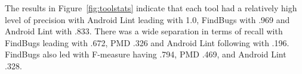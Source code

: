 \documentclass{sig-alternate}
\newcommand{\todo}[1]{\textcolor{cyan}{\textbf{[#1]}}}
\begin{document}



The results in  Figure~\ref{fig:toolstats} indicate that each tool had a relatively high level of precision with Android Lint leading with 1.0, FindBugs with .969 and Android Lint with .833. There was a wide separation in terms of recall with FindBugs leading with .672, PMD .326 and Android Lint following with .196. FindBugs also led with F-measure having .794, PMD .469, and Android Lint .328.












\end{document}
